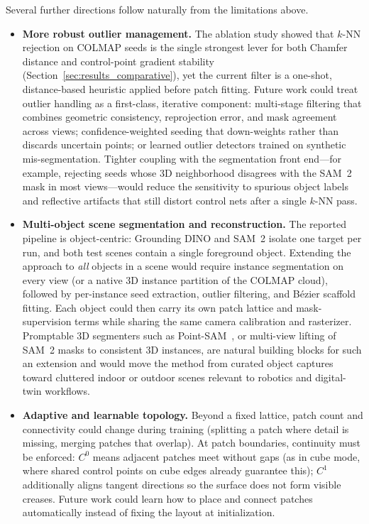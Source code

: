 Several further directions follow naturally from the limitations above.

\begin{itemize}
    \item \textbf{More robust outlier management.} The ablation study showed that $k$-NN rejection on COLMAP seeds is the single strongest lever for both Chamfer distance and control-point gradient stability (Section~\ref{sec:results_comparative}), yet the current filter is a one-shot, distance-based heuristic applied before patch fitting. Future work could treat outlier handling as a first-class, iterative component: multi-stage filtering that combines geometric consistency, reprojection error, and mask agreement across views; confidence-weighted seeding that down-weights rather than discards uncertain points; or learned outlier detectors trained on synthetic mis-segmentation. Tighter coupling with the segmentation front end---for example, rejecting seeds whose 3D neighborhood disagrees with the SAM~2 mask in most views---would reduce the sensitivity to spurious object labels and reflective artifacts that still distort control nets after a single $k$-NN pass.
    \item \textbf{Multi-object scene segmentation and reconstruction.} The reported pipeline is object-centric: Grounding DINO and SAM~2 isolate one target per run, and both test scenes contain a single foreground object. Extending the approach to \emph{all} objects in a scene would require instance segmentation on every view (or a native 3D instance partition of the COLMAP cloud), followed by per-instance seed extraction, outlier filtering, and B\'ezier scaffold fitting. Each object could then carry its own patch lattice and mask-supervision terms while sharing the same camera calibration and rasterizer. Promptable 3D segmenters such as Point-SAM~\cite{zhou2025pointsam}, or multi-view lifting of SAM~2 masks to consistent 3D instances, are natural building blocks for such an extension and would move the method from curated object captures toward cluttered indoor or outdoor scenes relevant to robotics and digital-twin workflows.
    \item \textbf{Adaptive and learnable topology.} Beyond a fixed lattice, patch count and connectivity could change during training (splitting a patch where detail is missing, merging patches that overlap). At patch boundaries, continuity must be enforced: $C^0$ means adjacent patches meet without gaps (as in cube mode, where shared control points on cube edges already guarantee this); $C^1$ additionally aligns tangent directions so the surface does not form visible creases. Future work could learn how to place and connect patches automatically instead of fixing the layout at initialization.

\end{itemize}
